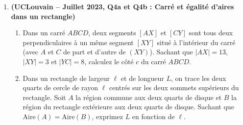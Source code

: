 \begin{enumerate}[label=\textbf{Exercice 5.\arabic* --}, align=left, leftmargin=*]
    \item \textbf{(UCLouvain -- Juillet 2023, Q4a et Q4b : Carré et égalité d'aires dans un rectangle)}
    \begin{enumerate}[label=(\alph*)]
        \item Dans un carré $ABCD$, deux segments $[AX]$ et $[CY]$ sont tous deux perpendiculaires à un même segment $[XY]$ situé à l'intérieur du carré (avec $A$ et $C$ de part et d'autre de $(XY)$). Sachant que $|AX| = 13$, $|XY| = 3$ et $|YC| = 8$, calculez le côté $c$ du carré $ABCD$.
        \item Dans un rectangle de largeur $\ell$ et de longueur $L$, on trace les deux quarts de cercle de rayon $\ell$ centrés sur les deux sommets supérieurs du rectangle. Soit $A$ la région commune aux deux quarts de disque et $B$ la région du rectangle extérieure aux deux quarts de disque. Sachant que $\text{Aire}(A) = \text{Aire}(B)$, exprimez $L$ en fonction de $\ell$.
    \end{enumerate}

\end{enumerate}
